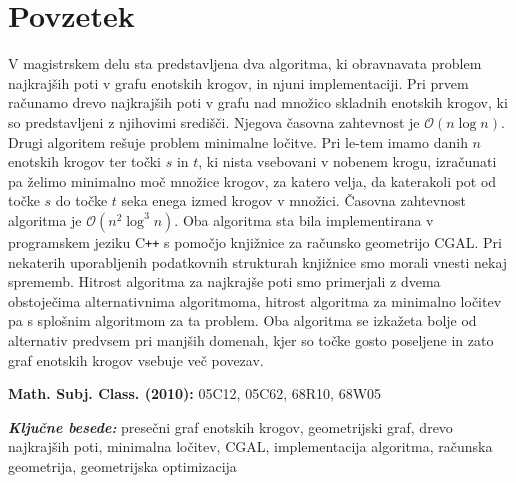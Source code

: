 \documentclass[a4paper, 12pt]{book}
\newcommand{\OO}{\ensuremath{\mathcal{O}}} %
\newcommand{\clearemptydoublepage}{\newpage{\pagestyle{empty}\cleardoublepage}}
\begin{document}
\clearemptydoublepage
\def\thepage{}
\chapter*{Povzetek}
V magistrskem delu sta predstavljena dva algoritma, ki obravnavata problem najkrajših poti v grafu enotskih krogov, in njuni implementaciji. Pri prvem računamo drevo najkrajših poti v grafu nad množico skladnih enotskih krogov, ki so predstavljeni z njihovimi središči. Njegova časovna zahtevnost je $\OO(n\log n)$. Drugi algoritem rešuje problem minimalne ločitve. Pri le-tem imamo danih $n$ enotskih krogov ter točki $s$ in $t$, ki nista vsebovani v nobenem krogu, izračunati pa želimo minimalno moč množice krogov, za katero velja, da katerakoli pot od točke $s$ do točke $t$ seka enega izmed krogov v množici. Časovna zahtevnost algoritma je $\OO(n^2\log^3n)$. Oba algoritma sta bila implementirana v programskem jeziku C\texttt{+}\texttt{+} s pomočjo knjižnice za računsko geometrijo CGAL. Pri nekaterih uporabljenih podatkovnih strukturah knjižnice smo morali vnesti nekaj sprememb. Hitrost algoritma za najkrajše poti smo primerjali z dvema obstoječima alternativnima algoritmoma, hitrost algoritma za minimalno ločitev pa s splošnim algoritmom za ta problem. Oba algoritma se izkažeta bolje od alternativ predvsem pri manjših domenah, kjer so točke gosto poseljene in zato graf enotskih krogov vsebuje več povezav.
\bigbreak

\begin{flushleft}
\textbf{Math. Subj. Class. (2010): } 05C12, 05C62, 68R10, 68W05

\textbf{\textit{Ključne besede: }}presečni graf enotskih krogov, geometrijski graf, drevo najkrajših poti, minimalna ločitev, CGAL, implementacija algoritma, računska geometrija, geometrijska optimizacija
\end{flushleft}
\clearemptydoublepage
\end{document}
